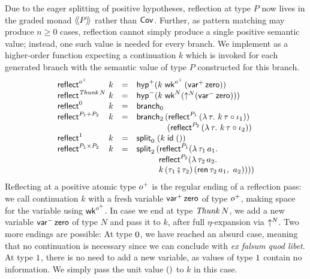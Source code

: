 \documentclass[sigplan,screen,fleqn]{acmart}
\begin{document}
Due to the eager splitting of positive hypotheses, reflection at type $P$
now lives in the graded monad $\langle\!\langle P \rangle\!\rangle$ rather than $\mathsf{Cov}^{}$.  Further,
as pattern matching may produce $n \geq 0$ cases, reflection cannot simply
produce a single positive semantic value; instead, one such value is needed
for every branch.  We implement
as a higher-order function expecting a continuation $k$ which is
invoked for each generated branch with the semantic value of type $P$
constructed for this branch.
\[
\renewcommand{\left}{}
\renewcommand{\right}{}
\begin{array}{l@{~}lcl}
  \reflect {\patom} & k & = &
    \phyp \left( k\;\twk^{\patom}\,(\pvar\,\tzero) \right) \\
  \reflect {\Thunk N} & k & = &
    \nhyp \left( k\;\twk^N \left( \up N (\nvar\,\tzero) \right) \right)\\
  \reflect {\tyzero} & k & = & \nbranch \\
  \reflect {P_1 + P_2} & k & = & \bbranch
    \,\left( \treflect^{P_1}\,(\lambda\,\tau. \ k\,\tau \comp \iota_1) \right)
\\ &&& \qquad \quad \ \,
    \,\left( \treflect^{P_2}\,(\lambda\,\tau. \ k\,\tau \comp \iota_2) \right)
    \\
  \reflect{\tyone} & k & = & \nsplit\;(k\;\tid\;\ttempty) \\
  \reflect{P_1 \times P_2} & k & = & \bsplit
    \,\left(
      \treflect^{P_1} \left( \lambda\,\tau_1\,a_1. \
\\ &&& \qquad \ \
      \treflect^{P_2} \left( \lambda\,\tau_2\,a_2. \
\\ &&& \qquad \ \
        k\, (\tau_1 \rcomp \tau_2)\, (\tren\,\tau_2\,a_1, \ a_2)
        \right)
      \right)
    \right)
\end{array}
\]
Reflecting at a positive atomic type $o^+$ is the regular ending of a
reflection pass: we call continuation $k$ with a fresh variable
$\mathsf{var}^{+}\,\mathsf{zero}$ of type $o^+$, making space for the variable
using $\mathsf{wk}^{o^+}$.
In case we end at type $\mathit{Thunk}\,N$, we add a new variable
$\mathsf{var}^{-}\,\mathsf{zero}$ of type $N$ and pass it to $k$, after full
$\eta$-expansion via $\mathord{\uparrow_{}^{N}}$.  Two more endings are possible:
At type
$0$, we have reached an absurd case, meaning that no
continuation is necessary since we can conclude with
\emph{ex falsum quod libet}.
At type $1$, there is no need to add a new variable, as values
of type $1$ contain no information.  We simply pass the unit
value $()$ to $k$ in this case.
\end{document}
